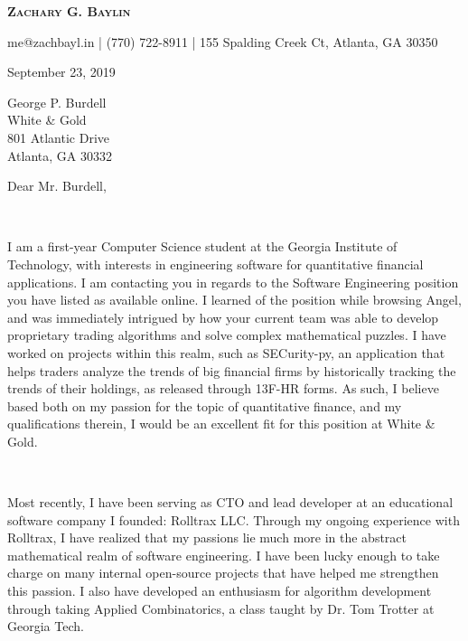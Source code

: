 \documentclass{article}
\newcommand{\infosep}{\hspace{2pt} | \hspace{2pt}}
\begin{document}
  {\centering
    {\LARGE \textbf{\textsc{Zachary G. Baylin}}}

    \vspace{3pt}

    me@zachbayl.in \infosep (770) 722-8911 \infosep 155 Spalding Creek Ct, Atlanta, GA 30350

  }
  \begin{flushright}
    September 23, 2019
  \end{flushright}

  \begin{flushleft}
    \noindent George P. Burdell\\
    White \& Gold\\
    801 Atlantic Drive\\
    Atlanta, GA 30332
  \end{flushleft}

  \noindent Dear Mr. Burdell,

  ~

  I am a first-year Computer Science student at the Georgia Institute of Technology, with interests in engineering software for quantitative financial applications. I am contacting you in regards to the Software Engineering position you have listed as available online. I learned of the position while browsing Angel, and was immediately intrigued by how your current team was able to develop proprietary trading algorithms and solve complex mathematical puzzles. I have worked on projects within this realm, such as SECurity-py, an application that helps traders analyze the trends of big financial firms by historically tracking the trends of their holdings, as released through 13F-HR forms. As such, I believe based both on my passion for the topic of quantitative finance, and my qualifications therein, I would be an excellent fit for this position at White \& Gold.

  ~

  Most recently, I have been serving as CTO and lead developer at an educational software company I founded: Rolltrax LLC. Through my ongoing experience with Rolltrax, I have realized that my passions lie much more in the abstract mathematical realm of software engineering. I have been lucky enough to take charge on many internal open-source projects that have helped me strengthen this passion. I also have developed an enthusiasm for algorithm development through taking Applied Combinatorics, a class taught by Dr. Tom Trotter at Georgia Tech.

  ~
\end{document}
